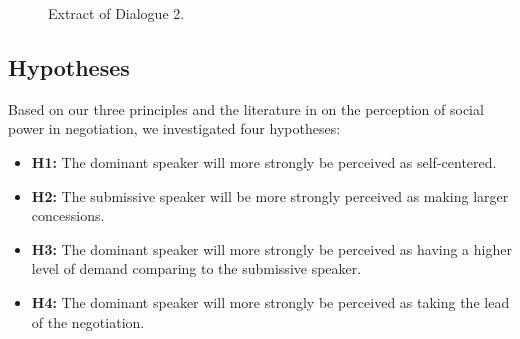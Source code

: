 \documentclass{llncs}
\begin{document}
	
	\begin{figure}
		
		\caption{\label{fig:ex-dialogue}Extract of Dialogue 2.}
	\end{figure}
		
	\subsection{Hypotheses}
	Based on our three principles and the literature in on the perception of social power in negotiation, we investigated four hypotheses:
	\begin{itemize}
		\item  \textbf{H1:} The dominant speaker will more strongly be perceived as self-centered.  
		
		\item \textbf{H2:} The submissive speaker will be more strongly perceived as making larger concessions.
		
		\item \textbf{H3:}  The dominant speaker will more strongly be perceived as having a higher level of demand comparing to the submissive speaker.
		
		\item \textbf{H4:}  The dominant speaker will more strongly be perceived as taking the lead of the negotiation.
		
	\end{itemize}
	
\end{document}
